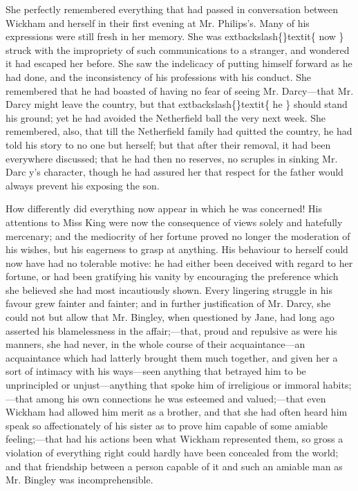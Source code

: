 \documentclass[10pt]{book}
\begin{document}
   She perfectly remembered everything that had passed in conversation
between Wickham and herself in their first evening at Mr. Philips’s.
Many of his expressions were still fresh in her memory. She was
   	extbackslash\{\}textit\{
    now
   \}
   struck with the impropriety of such communications to a stranger, and
wondered it had escaped her before. She saw the indelicacy of putting
himself forward as he had done, and the inconsistency of his professions
with his conduct. She remembered that he had boasted of having no fear
of seeing Mr. Darcy—that Mr. Darcy might leave the country, but that
   	extbackslash\{\}textit\{
    he
   \}
   should stand his ground; yet he had avoided the Netherfield ball
the very next week. She remembered, also, that till the Netherfield
family had quitted the country, he had told his story to no one but
herself; but that after their removal, it had been everywhere discussed;
that he had then no reserves, no scruples in sinking Mr. Darc
   y’s
character, though he had assured her that respect for the father would
always prevent his exposing the son.
  

   How differently did everything now appear in which he was concerned! His
attentions to Miss King were now the consequence of views solely and
hatefully mercenary; and the mediocrity of her fortune proved no longer
the moderation of his wishes, but his eagerness to grasp at anything.
His behaviour to herself could now have had no tolerable motive: he had
either been deceived with regard to her fortune, or had been gratifying
his vanity by encouraging the preference which she believed she had most
incautiously shown. Every lingering struggle in his favour grew fainter
and fainter; and in further justification of Mr. Darcy, she could not
but allow that Mr. Bingley, when questioned by Jane, had long ago
asserted his blamelessness in the affair;—that, proud and repulsive as
were his manners, she had never, in the whole course of their
acquaintance—an acquaintance which had latterly brought them much
together, and given her a sort of intimacy with his ways—seen anything
that betrayed him to be unprincipled or unjust—anything that spoke him
of irreligious or immoral habits;—that among his own connections he was
esteemed and valued;—that even Wickham had allowed him merit as a
brother, and that she had often heard him speak so affectionately of his
sister as to prove him capable of some amiable feeling;—that had his
actions been what Wickham represented them, so gross a violation of
everything right could hardly have been concealed from the world; and
that friendship between a person capable of it and such an amiable man
as Mr. Bingley was incomprehensible.
  
\end{document}
